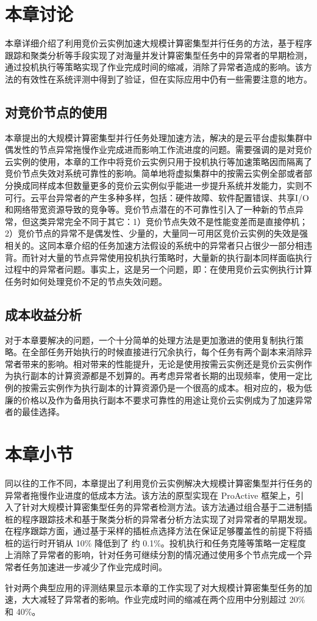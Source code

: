 \section{本章讨论}
本章详细介绍了利用竞价云实例加速大规模计算密集型并行任务的方法，基于程序跟踪和聚类分析等手段实现了对海量并发计算密集型任务中的异常者的早期检测，通过投机执行等策略实现了作业完成时间的缩减，消除了异常者造成的影响。该方法的有效性在系统评测中得到了验证，但在实际应用中仍有一些需要注意的地方。

\subsection{对竞价节点的使用}
本章提出的大规模计算密集型并行任务处理加速方法，解决的是云平台虚拟集群中偶发性的节点异常拖慢作业完成进而影响工作流进度的问题。需要强调的是对竞价云实例的使用，本章的工作中将竞价云实例只用于投机执行等加速策略因而隔离了竞价节点失效对系统可靠性的影响。简单地将虚拟集群中的按需云实例全部或者部分换成同样成本但数量更多的竞价云实例似乎能进一步提升系统并发能力，实则不可行。云平台异常者的产生多种多样，包括：硬件故障、软件配置错误、共享I/O和网络带宽资源导致的竞争等。竞价节点潜在的不可靠性引入了一种新的节点异常，但这类异常完全不同于其它：1）竞价节点失效不是性能变差而是直接停机；2）竞价节点的异常不是偶发性、少量的，大量同一可用区竞价云实例的失效是强相关的。这同本章介绍的任务加速方法假设的系统中的异常者只占很少一部分相违背。而针对大量的节点异常使用投机执行策略时，大量新的执行副本同样面临执行过程中的异常者问题。事实上，这是另一个问题，即：在使用竞价云实例执行计算任务时如何处理竞价不足的节点失效问题。

\subsection{成本收益分析}
对于本章要解决的问题，一个十分简单的处理方法是更加激进的使用复制执行策略。在全部任务开始执行的时候直接进行冗余执行，每个任务有两个副本来消除异常者带来的影响。相对带来的性能提升，无论是使用按需云实例还是竞价云实例作为执行副本的计算资源都是不划算的。再考虑异常者长期的出现频率，使用一定比例的按需云实例作为执行副本的计算资源仍是一个很高的成本。相对应的，极为低廉的价格以及作为备用执行副本不要求可靠性的用途让竞价云实例成为了加速异常者的最佳选择。

\section{本章小节}
同以往的工作不同，本章提出了利用竞价云实例解决大规模计算密集型并行任务的异常者拖慢作业进度的低成本方法。该方法的原型实现在 ProActive 框架上，引入了针对大规模计算密集型任务的异常者检测方法。该方法通过组合基于二进制插桩的程序跟踪技术和基于聚类分析的异常者分析方法实现了对异常者的早期发现。在程序跟踪方面，通过基于采样的插桩点选择方法在保证足够覆盖性的前提下将插桩的运行时开销从 10\% 降低到了 约 0.1\%。投机执行和任务克隆等策略一定程度上消除了异常者的影响，针对任务可继续分割的情况通过使用多个节点完成一个异常者任务加速进一步减少了作业完成时间。

针对两个典型应用的评测结果显示本章的工作实现了对大规模计算密集型任务的加速，大大减轻了异常者的影响。作业完成时间的缩减在两个应用中分别超过 20\% 和 40\%。